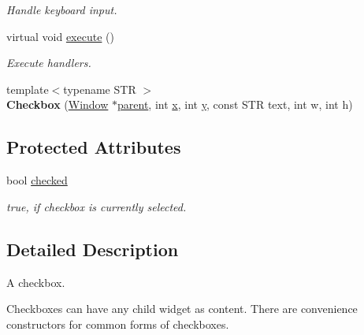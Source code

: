 \begin{DoxyCompactItemize}
\begin{DoxyCompactList}\small\item\em Handle keyboard input. \end{DoxyCompactList}\item 
\hypertarget{classGUI_1_1Checkbox_a578d66f5d9006c6bbedbffbfd769caef}{virtual void \hyperlink{classGUI_1_1Checkbox_a578d66f5d9006c6bbedbffbfd769caef}{execute} ()}\label{classGUI_1_1Checkbox_a578d66f5d9006c6bbedbffbfd769caef}

\begin{DoxyCompactList}\small\item\em Execute handlers. \end{DoxyCompactList}\item 
\hypertarget{classGUI_1_1Checkbox_a0bdc8dc98a056bd1d7164aa5e5fb3e82}{{\footnotesize template$<$typename S\-T\-R $>$ }\\{\bfseries Checkbox} (\hyperlink{classGUI_1_1Window}{Window} $\ast$\hyperlink{classGUI_1_1Window_a2e593ff65e7702178d82fe9010a0b539}{parent}, int \hyperlink{classGUI_1_1Window_a6ca6a80ca00c9e1d8ceea8d3d99a657d}{x}, int \hyperlink{classGUI_1_1Window_a0ee8e923aff2c3661fc2e17656d37adf}{y}, const S\-T\-R text, int w, int h)}\label{classGUI_1_1Checkbox_a0bdc8dc98a056bd1d7164aa5e5fb3e82}

\end{DoxyCompactItemize}
\subsection*{Protected Attributes}
\begin{DoxyCompactItemize}
\item 
\hypertarget{classGUI_1_1Checkbox_ab9e40eb561978770aad1095906c4fb65}{bool \hyperlink{classGUI_1_1Checkbox_ab9e40eb561978770aad1095906c4fb65}{checked}}\label{classGUI_1_1Checkbox_ab9e40eb561978770aad1095906c4fb65}

\begin{DoxyCompactList}\small\item\em {\ttfamily true}, if checkbox is currently selected. \end{DoxyCompactList}\end{DoxyCompactItemize}


\subsection{Detailed Description}
A checkbox. 

Checkboxes can have any child widget as content. There are convenience constructors for common forms of checkboxes. 

